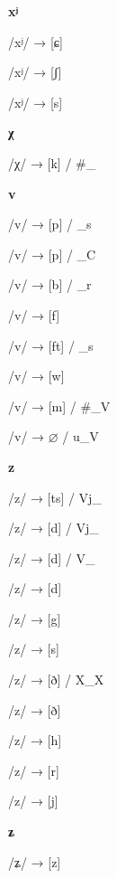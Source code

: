 \begin{center}\textbf{xʲ}\end{center}
\begin{multicols}{4}
\noindent /xʲ/ → [ɕ]

\noindent /xʲ/ → [ʃ]

\noindent /xʲ/ → [s]
\end{multicols}


\begin{center}\textbf{χ}\end{center}
\begin{multicols}{4}
\noindent /χ/ → [k] / \#\_
\end{multicols}


\begin{center}\textbf{v}\end{center}
\begin{multicols}{4}
\noindent /v/ → [p] / \_s

\noindent /v/ → [p] / \_C

\noindent /v/ → [b] / \_r

\noindent /v/ → [f]

\noindent /v/ → [ft] / \_s

\noindent /v/ → [w]

\noindent /v/ → [m] / \#\_V

\noindent /v/ → $\varnothing$ / u\_V
\end{multicols}

\begin{center}\textbf{z}\end{center}
\begin{multicols}{4}
\noindent /z/ → [ts] / Vj\_

\noindent /z/ → [d] / Vj\_

\noindent /z/ → [d] / V\_

\noindent /z/ → [d]

\noindent /z/ → [g]

\noindent /z/ → [s]

\noindent /z/ → [ð] / X\_X

\noindent /z/ → [ð]

\noindent /z/ → [h]

\noindent /z/ → [r]

\noindent /z/ → [j]
\end{multicols}


\begin{center}\textbf{ʑ}\end{center}
\begin{multicols}{4}
\noindent /ʑ/ → [z]
\end{multicols}


